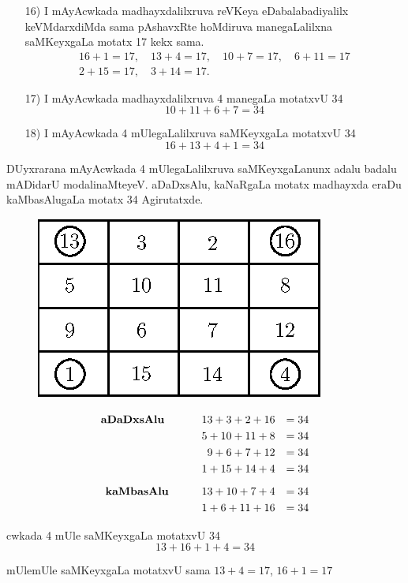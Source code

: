 \begin{enumerate}
\item[{\rm 16)}] I mAyAcwkada madhayxdalilxruva reVKeya eDabalabadiyalilx keVMdarxdiMda sama pAshavxRte hoMdiruva manegaLalilxna saMKeyxgaLa motatx {\rm 17} kekx sama.
\begin{gather*}
16+1=17, \quad 13+4=17, \quad 10+7=17, \quad 6+11=17 \\
2+15=17, \quad 3+14=17.
\end{gather*}
 
\item[{\rm 17)}] I mAyAcwkada madhayxdalilxruva {\rm 4} manegaLa motatxvU {\rm 34}
$$
10+11+6+7=34
$$

\item[{\rm 18)}] I mAyAcwkada {\rm 4} mUlegaLalilxruva saMKeyxgaLa motatxvU {\rm 34}
$$
16+13+4+1=34
$$
\end{enumerate}

DUyxrarana mAyAcwkada {\rm 4} mUlegaLalilxruva saMKeyxgaLanunx adalu badalu mADidarU modalinaMteyeV. aDaDxsAlu, kaNaRgaLa motatx madhayxda eraDu kaMbasAlugaLa motatx {\rm 34} Agirutatxde.
\begin{figure}[H]
\centering
\includegraphics[scale=.8]{src/figures/m_123.eps}
\end{figure}


\begin{alignat*}{3}
\text{\bf aDaDxsAlu }\qquad  && 13+3+2+16&&=34\\
&&5+10+11+8&&=34\\
&&9+6+7+12&&=34\\
&&1+15+14+4&&=34\\[0.2cm]
\text{\bf kaMbasAlu} \qquad  &&13+10+7+4 &&=34\\
&&1+6+11+16&&=34
\end{alignat*}

cwkada {\rm 4} mUle saMKeyxgaLa motatxvU {\rm 34}
$$
13+16+1+4=34
$$

mUlemUle saMKeyxgaLa motatxvU sama $13+4=17$, \quad $16+1=17$

